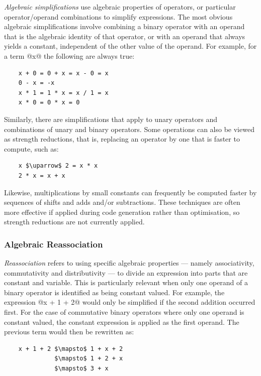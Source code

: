 \emph{Algebraic simplifications} use algebraic properties of operators, or
particular operator/operand combinations to simplify expressions. The most
obvious algebraic simplifications involve combining a binary operator with an
operand that is the algebraic identity of that operator, or with an operand that
always yields a constant, independent of the other value of the operand. For
example, for a term @x@ the following are always true:
%
\begin{lstlisting}[style=Haskell,numbers=none]
%\bf$\langle$ algebraic simplification $\rangle$%
    x + 0 = 0 + x = x - 0 = x
    0 - x = -x
    x * 1 = 1 * x = x / 1 = x
    x * 0 = 0 * x = 0
\end{lstlisting}
%
Similarly, there are simplifications that apply to unary operators and
combinations of unary and binary operators. Some operations can also be viewed
as strength reductions, that is, replacing an operator by one that is faster to
compute, such as:
%
\begin{lstlisting}[style=Haskell,numbers=none,mathescape]
%\bf$\langle$ strength reduction $\rangle$%
    x $\uparrow$ 2 = x * x
    2 * x = x + x
\end{lstlisting}
%
Likewise, multiplications by small constants can frequently be computed faster
by sequences of shifts and adds and/or subtractions. These techniques are often
more effective if applied during code generation rather than optimisation, so
strength reductions are not currently applied.


\subsubsection{Algebraic Reassociation}

\emph{Reassociation} refers to using specific algebraic properties --- namely
associativity, commutativity and distributivity --- to divide an expression into
parts that are constant and variable.
This is particularly relevant when only one operand of a binary
operator is identified as being constant valued. For example, the expression
@x + 1 + 2@ would only be simplified if the second addition occurred
first. For the case of commutative binary operators where only one operand is
constant valued, the constant expression is applied as the first operand. The
previous term would then be rewritten as:
%
\begin{lstlisting}[style=Haskell,numbers=none,mathescape]
%\bf$\langle$ algebraic reassociation $\rangle$%
    x + 1 + 2 $\mapsto$ 1 + x + 2
              $\mapsto$ 1 + 2 + x
              $\mapsto$ 3 + x
\end{lstlisting}


